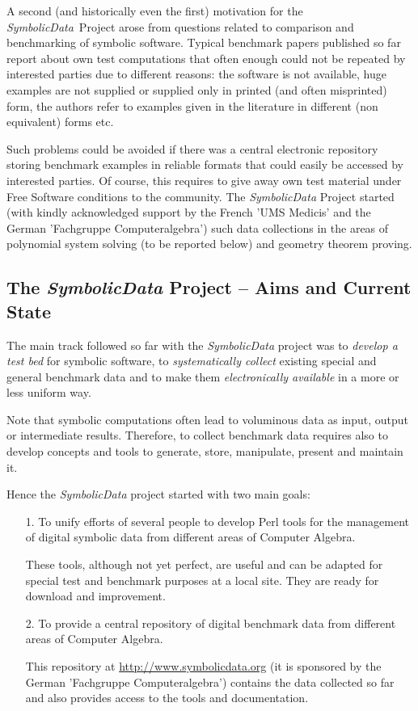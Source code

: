 \documentclass[11pt]{article}
\newcommand{\SD}{{\em Symbo\-lic\-Data}}
\begin{document}
A second (and historically even the first) motivation for the \SD\
Project arose from questions related to comparison and benchmarking of
symbolic software. Typical benchmark papers published so far report
about own test computations that often enough could not be repeated by
interested parties due to different reasons: the software is not
available, huge examples are not supplied or supplied only in printed
(and often misprinted) form, the authors refer to examples given in
the literature in different (non equivalent) forms etc.

Such problems could be avoided if there was a central electronic
repository storing benchmark examples in reliable formats that
could easily be accessed by interested parties. Of course, this
requires to give away own test material under Free Software
conditions to the community.  The {\SD} Project started (with
kindly acknowledged support by the French 'UMS Medicis' and the
German 'Fachgruppe Computeralgebra') such data collections in the
areas of polynomial system solving (to be reported below) and
geometry theorem proving. 

\subsection{The {\SD} Project -- Aims and Current State}

The main track followed so far with the {\SD} project was to {\em
develop a test bed} for symbolic software, to {\em systematically
collect} existing special and general benchmark data and to make them
{\em electronically available} in a more or less uniform way.

Note that symbolic computations often lead to voluminous data as
input, output or intermediate results. Therefore, to collect benchmark
data requires also to develop concepts and tools to generate, store,
manipulate, present and maintain it.

Hence the {\SD} project started with two main goals: 
\begin{itemize}
\item[1.] To unify efforts of several people to develop Perl
tools for the management of digital symbolic data from different
areas of Computer Algebra.

These tools, although not yet perfect, are useful and can be adapted
for special test and benchmark purposes at a local site. They are
ready for download and improvement.

\item[2.] To provide a central repository of digital benchmark
data from different areas of Computer Algebra.

This repository at \url{http://www.symbolicdata.org} (it is sponsored
by the German 'Fachgruppe Computeralgebra') contains the data
collected so far and also provides access to the tools and
documentation.
\end{itemize}
\end{document}
